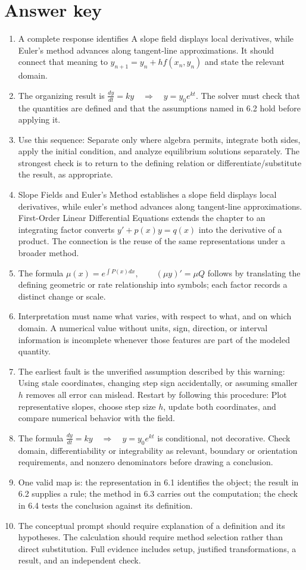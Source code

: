 \documentclass[11pt]{article}
\begin{document}
\section{Answer key}
\small
\begin{enumerate}
\item A complete response identifies A slope field displays local derivatives, while Euler's method advances along tangent-line approximations. It should connect that meaning to \(y_{n+1}=y_n+h f(x_n,y_n)\) and state the relevant domain.
\item The organizing result is \(\frac{dy}{dt}=ky\quad\Longrightarrow\quad y=y_0e^{kt}\). The solver must check that the quantities are defined and that the assumptions named in 6.2 hold before applying it.
\item Use this sequence: Separate only where algebra permits, integrate both sides, apply the initial condition, and analyze equilibrium solutions separately. The strongest check is to return to the defining relation or differentiate/substitute the result, as appropriate.
\item Slope Fields and Euler's Method establishes a slope field displays local derivatives, while euler's method advances along tangent-line approximations. First-Order Linear Differential Equations extends the chapter to an integrating factor converts $y'+p(x)y=q(x)$ into the derivative of a product. The connection is the reuse of the same representations under a broader method.
\item The formula \(\mu(x)=e^{\int P(x)dx},\qquad (\mu y)'=\mu Q\) follows by translating the defining geometric or rate relationship into symbols; each factor records a distinct change or scale.
\item Interpretation must name what varies, with respect to what, and on which domain. A numerical value without units, sign, direction, or interval information is incomplete whenever those features are part of the modeled quantity.
\item The earliest fault is the unverified assumption described by this warning: Using stale coordinates, changing step sign accidentally, or assuming smaller $h$ removes all error can mislead. Restart by following this procedure: Plot representative slopes, choose step size $h$, update both coordinates, and compare numerical behavior with the field.
\item The formula \(\frac{dy}{dt}=ky\quad\Longrightarrow\quad y=y_0e^{kt}\) is conditional, not decorative. Check domain, differentiability or integrability as relevant, boundary or orientation requirements, and nonzero denominators before drawing a conclusion.
\item One valid map is: the representation in 6.1 identifies the object; the result in 6.2 supplies a rule; the method in 6.3 carries out the computation; the check in 6.4 tests the conclusion against its definition.
\item The conceptual prompt should require explanation of a definition and its hypotheses. The calculation should require method selection rather than direct substitution. Full evidence includes setup, justified transformations, a result, and an independent check.
\end{enumerate}
\normalsize
\end{document}
